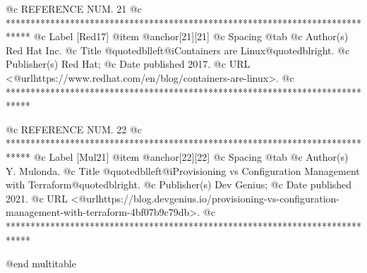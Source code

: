 @c REFERENCE NUM. 21
@c *****************************************************************************
@c Label [Red17]
@item @anchor{[21]}[21]
@c Spacing
@tab
@c Author(s)
Red Hat Inc.
@c Title
@quotedblleft{}@i{Containers are Linux}@quotedblright{}.
@c Publisher(s)
Red Hat;
@c Date published
2017.
@c URL
<@url{https://www.redhat.com/en/blog/containers-are-linux}>.
@c *****************************************************************************

@c REFERENCE NUM. 22
@c *****************************************************************************
@c Label [Mul21]
@item @anchor{[22]}[22]
@c Spacing
@tab
@c Author(s)
Y. Mulonda.
@c Title
@quotedblleft{}@i{Provisioning vs Configuration Management with Terraform}@quotedblright{}.
@c Publisher(s)
Dev Genius;
@c Date published
2021.
@c URL
<@url{https://blog.devgenius.io/provisioning-vs-configuration-management-with-terraform-4bf07b9c79db}>.
@c *****************************************************************************

@end multitable
